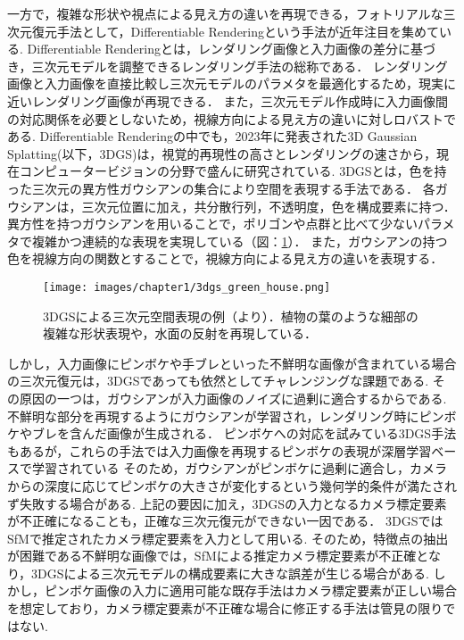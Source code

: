 一方で，複雑な形状や視点による見え方の違いを再現できる，フォトリアルな三次元復元手法として，Differentiable Renderingという手法が近年注目を集めている.
Differentiable Renderingとは，レンダリング画像と入力画像の差分に基づき，三次元モデルを調整できるレンダリング手法の総称である\cite{differentiable_rendering}．
レンダリング画像と入力画像を直接比較し三次元モデルのパラメタを最適化するため，現実に近いレンダリング画像が再現できる．
また，三次元モデル作成時に入力画像間の対応関係を必要としないため，視線方向による見え方の違いに対しロバストである.
Differentiable Renderingの中でも，2023年に発表された3D Gaussian Splatting(以下，3DGS)\cite{3dgs}は，視覚的再現性の高さとレンダリングの速さから，現在コンピュータービジョンの分野で盛んに研究されている.
3DGSとは，色を持った三次元の異方性ガウシアンの集合により空間を表現する手法である．
各ガウシアンは，三次元位置に加え，共分散行列，不透明度，色を構成要素に持つ．
異方性を持つガウシアンを用いることで，ポリゴンや点群と比べて少ないパラメタで複雑かつ連続的な表現を実現している（図：\ref{fig:green-house}）．
また，ガウシアンの持つ色を視線方向の関数とすることで，視線方向による見え方の違いを表現する．\par

\begin{figure}[h]
    \centering
    \texttt{[image: images/chapter1/3dgs\_green\_house.png]}
    \caption[3DGSによる三次元空間表現の例]{3DGSによる三次元空間表現の例（\cite{green-house}より）．植物の葉のような細部の複雑な形状表現や，水面の反射を再現している．}
    \label{fig:green-house}
\end{figure}

しかし，入力画像にピンボケや手ブレといった不鮮明な画像が含まれている場合の三次元復元は，3DGSであっても依然としてチャレンジングな課題である.
その原因の一つは，ガウシアンが入力画像のノイズに過剰に適合するからである.
不鮮明な部分を再現するようにガウシアンが学習され，レンダリング時にピンボケやブレを含んだ画像が生成される．
ピンボケへの対応を試みている3DGS手法\cite{Deblurring3dgs}\cite{BAGS}もあるが，これらの手法では入力画像を再現するピンボケの表現が深層学習ベースで学習されている
そのため，ガウシアンがピンボケに過剰に適合し，カメラからの深度に応じてピンボケの大きさが変化するという幾何学的条件が満たされず失敗する場合がある.
上記の要因に加え，3DGSの入力となるカメラ標定要素が不正確になることも，正確な三次元復元ができない一因である．
3DGSではSfMで推定されたカメラ標定要素を入力として用いる.
そのため，特徴点の抽出が困難である不鮮明な画像では，SfMによる推定カメラ標定要素が不正確となり，3DGSによる三次元モデルの構成要素に大きな誤差が生じる場合がある.
しかし，ピンボケ画像の入力に適用可能な既存手法はカメラ標定要素が正しい場合を想定しており，カメラ標定要素が不正確な場合に修正する手法は管見の限りではない.\par

